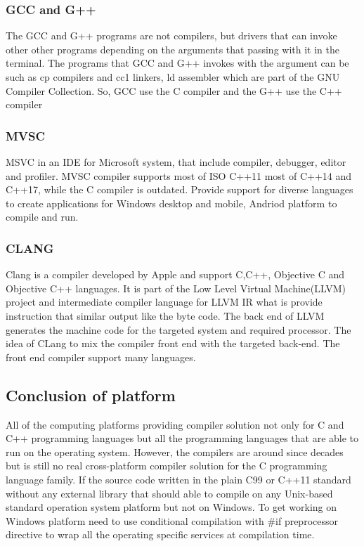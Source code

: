 \documentclass[12pt]{article}
\begin{document}
\subsubsection{GCC and G++}
The GCC and G++ programs are not compilers, but drivers that can invoke other other programs depending on the arguments that passing with it in the terminal. The programs that GCC and G++ invokes with the argument can be such as cp compilers and cc1 linkers, ld assembler which are part of the GNU Compiler Collection. So, GCC use the C compiler and the G++ use the C++ compiler\cite{Rohan} 

\subsubsection{MVSC}
MSVC in an IDE for Microsoft system, that include compiler, debugger, editor and profiler. MVSC compiler supports most of ISO C++11 most of C++14 and C++17, while the C compiler is outdated. Provide support for diverse languages to create applications for Windows desktop and mobile, Andriod platform to compile and run.\cite{Heng}\\

\subsubsection{CLANG}
Clang is a compiler developed by Apple and support C,C++, Objective C and Objective C++ languages. It is part of the Low Level Virtual Machine(LLVM) project and intermediate compiler language for LLVM IR what is provide instruction that similar output like the byte code. The back end of LLVM generates the machine code for the targeted system and required processor. The idea of CLang to mix the compiler front end with the targeted back-end. The front end compiler support many languages.\cite{BoltonD}

\subsection{Conclusion of platform}
All of the computing platforms providing compiler solution not only for C and C++ programming languages but all the programming languages that are able to run on the operating system. However, the compilers are around since decades but is still no real cross-platform compiler solution for the C programming language family. If the source code written in the plain C99 or C++11 standard without any external library that should able to compile on any Unix-based standard operation system platform but not on Windows. To get working on Windows platform need to use conditional compilation with \#if preprocessor directive to wrap all the operating specific services at compilation time.\\ 
\end{document}
